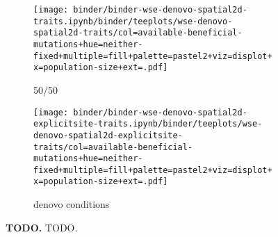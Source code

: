 \begin{sidewaysfigure}[h]
\begin{subfigure}[b]{0.47\linewidth}
    \begin{minipage}{\textwidth}
      \texttt{[image: binder/binder-wse-denovo-spatial2d-traits.ipynb/binder/teeplots/wse-denovo-spatial2d-traits/col=available-beneficial-mutations+hue=neither-fixed+multiple=fill+palette=pastel2+viz=displot+x=population-size+ext=.pdf]}%
    \end{minipage}
    \begin{minipage}{\textwidth}
    \caption{50/50}
    \label{fig:neither-fixed-wse:denovo}
    \end{minipage}%
\end{subfigure}%
\begin{subfigure}[b]{0.53\linewidth}
    \begin{minipage}{\textwidth}
      \texttt{[image: binder/binder-wse-denovo-spatial2d-explicitsite-traits.ipynb/binder/teeplots/wse-denovo-spatial2d-explicitsite-traits/col=available-beneficial-mutations+hue=neither-fixed+multiple=fill+palette=pastel2+viz=displot+x=population-size+ext=.pdf]}%
    \end{minipage}
    \begin{minipage}{\textwidth}
    \caption{denovo conditions}
    \label{fig:neither-fixed-wse:denovo-explicitsite}
    \end{minipage}%
\end{subfigure}

  \begin{minipage}{\textwidth}
    \caption{%
      \textbf{TODO.}
      \footnotesize
     TODO.
    }
    \label{fig:neither-fixed-wse}
  \end{minipage}
\end{sidewaysfigure}
